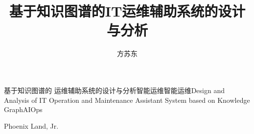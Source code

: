 \title{基于知识图谱的IT运维辅助系统的设计与分析}{基于知识图谱的  运维辅助系统的设计与分析}{智能运维}{智能运维}{Design and Analysis of IT Operation and Maintenance Assistant System based on Knowledge Graph}{AIOps}
\author{方苏东}{Phoenix Land, Jr.}
\authorizedate{\today}
\makebigcover
\makecover
